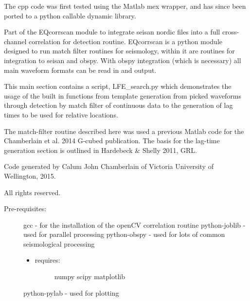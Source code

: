 \documentclass[a4paper,10pt,english]{sphinxmanual}
\begin{document}
The cpp code was first tested using the Matlab mex wrapper, and has since been
ported to a python callable dynamic library.

Part of the EQcorrscan module to integrate seisan nordic files into a full
cross-channel correlation for detection routine.
EQcorrscan is a python module designed to run match filter routines for
seismology, within it are routines for integration to seisan and obspy.
With obspy integration (which is necessary) all main waveform formats can be
read in and output.

This main section contains a script, LFE\_search.py which demonstrates the usage
of the built in functions from template generation from picked waveforms
through detection by match filter of continuous data to the generation of lag
times to be used for relative locations.

The match-filter routine described here was used a previous Matlab code for the
Chamberlain et al. 2014 G-cubed publication.  The basis for the lag-time
generation section is outlined in Hardebeck \& Shelly 2011, GRL.

Code generated by Calum John Chamberlain of Victoria University of Wellington,
2015.

All rights reserved.
\begin{description}
\item[{Pre-requisites:}] \leavevmode
gcc             - for the installation of the openCV correlation routine
python-joblib   - used for parallel processing
python-obspy    - used for lots of common seismological processing
\begin{itemize}
\item {} \begin{description}
\item[{requires:}] \leavevmode
numpy
scipy
matplotlib

\end{description}

\end{itemize}

python-pylab    - used for plotting

\end{description}
\end{document}
